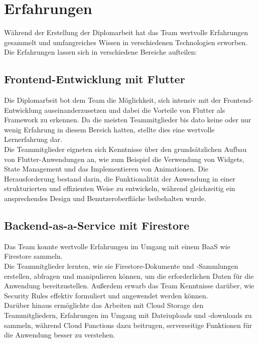 \section{Erfahrungen}

Während der Erstellung der Diplomarbeit hat das Team wertvolle Erfahrungen gesammelt und umfangreiches Wissen in verschiedenen Technologien erworben. Die Erfahrungen lassen sich in verschiedene Bereiche aufteilen:

\subsection{Frontend-Entwicklung mit Flutter}

Die Diplomarbeit bot dem Team die Möglichkeit, sich intensiv mit der Frontend-Entwicklung auseinanderzusetzen und dabei die Vorteile von Flutter als Framework zu erkennen. Da die meisten Teammitglieder bis dato keine oder nur wenig Erfahrung in diesem Bereich hatten, stellte dies eine wertvolle Lernerfahrung dar.
\\
Die Teammitglieder eigneten sich Kenntnisse über den grundsätzlichen Aufbau von Flutter-Anwendungen an, wie zum Beispiel die Verwendung von Widgets, State Management und das Implementieren von Animationen. Die Herausforderung bestand darin, die Funktionalität der Anwendung in einer strukturierten und effizienten Weise zu entwickeln, während gleichzeitig ein ansprechendes Design und Benutzeroberfläche beibehalten wurde.

\subsection{Backend-as-a-Service mit Firestore}

Das Team konnte wertvolle Erfahrungen im Umgang mit einem BaaS wie Firestore sammeln.
\\
Die Teammitglieder lernten, wie sie Firestore-Dokumente und -Sammlungen erstellen, abfragen und manipulieren können, um die erforderlichen Daten für die Anwendung bereitzustellen. Außerdem erwarb das Team Kenntnisse darüber, wie Security Rules effektiv formuliert und angewendet werden können.
\\
Darüber hinaus ermöglichte das Arbeiten mit Cloud Storage den Teammitgliedern, Erfahrungen im Umgang mit Dateiuploads und -downloads zu sammeln, während Cloud Functions dazu beitrugen, serverseitige Funktionen für die Anwendung besser zu verstehen.

